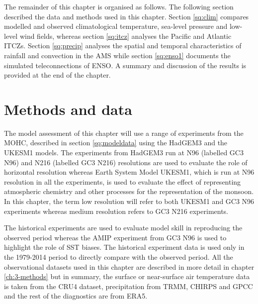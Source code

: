 The remainder of this chapter is organised as follows. The following section described the data and methods used in this chapter. Section  \ref{sq:clim} compares modelled and observed climatological temperature, sea-level pressure and low-level wind fields,  whereas section \ref{sq:itcz} analyses the Pacific and Atlantic ITCZs. Section \ref{sq:precip} analyses the spatial and temporal characteristics of rainfall and convection in the AMS while section \ref{sq:enso1} documents the simulated teleconnections of ENSO. A summary and discussion of the results is provided at the end of the chapter.

\section{Methods and data} 
\label{sq:meth_ch4}
The model assessment of this chapter will use a range of experiments from the MOHC, described in section \ref{sq:modeldata} using the HadGEM3 and the UKESM1 models. The experiments from HadGEM3 run at N96 (labelled GC3 N96) and N216 (labelled GC3 N216) resolutions are used to evaluate the role of horizontal resolution whereas Earth System Model UKESM1, which is run at N96 resolution in all the experiments, is used to evaluate the effect of representing atmospheric chemistry and other processes for the representation of the monsoon. 
In this chapter, the term low resolution will refer to both UKESM1 and GC3 N96 experiments whereas medium resolution refers to GC3 N216 experiments.%

The historical experiments are used to evaluate model skill in reproducing the observed period whereas the AMIP experiment from GC3 N96 is used to highlight the role of SST biases. The historical experiment data is used only in the 1979-2014 period to directly compare with the observed period.
All the observational datasets used in this chapter are described in more detail in chapter \ref{ch:3-methods} but in summary, the surface or near-surface air temperature data is taken from the CRU4 dataset, precipitation from TRMM, CHIRPS and GPCC and the rest of the diagnostics are from ERA5.

